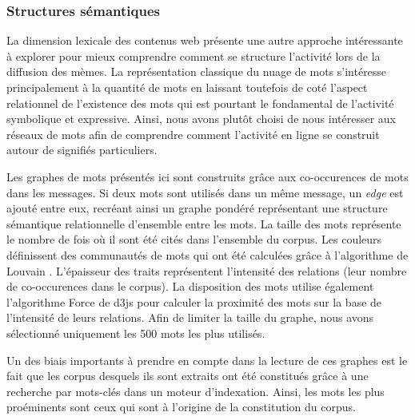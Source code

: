 \subsubsection[Structures s\'emantiques]{Structures s\'emantiques}
La dimension lexicale des contenus web pr\'esente une autre approche
int\'eressante \`a explorer pour mieux comprendre comment se structure
l{\textquoteright}activit\'e lors de la diffusion des m\`emes. La
repr\'esentation classique du nuage de mots
s{\textquoteright}int\'eresse principalement \`a la quantit\'e de mots
en laissant toutefois de cot\'e l{\textquoteright}aspect relationnel de
l{\textquoteright}existence des mots qui est pourtant le fondamental de
l{\textquoteright}activit\'e symbolique et expressive. Ainsi, nous
avons plut\^ot choisi de nous int\'eresser aux r\'eseaux de mots afin
de comprendre comment l{\textquoteright}activit\'e en ligne se
construit autour de signifi\'es particuliers.


Les graphes de mots pr\'esent\'es ici sont construits gr\^ace aux
co-occurences de mots dans les messages. Si deux mots sont utilis\'es
dans un m\^eme message, un \textit{edge} est ajout\'e entre eux,
recr\'eant ainsi un graphe pond\'er\'e repr\'esentant une structure
s\'emantique relationnelle d{\textquoteright}ensemble entre les mots.
La taille des mots repr\'esente le nombre de fois o\`u il sont \'et\'e
cit\'es dans l{\textquoteright}ensemble du corpus. Les couleurs
d\'efinissent des communaut\'es de mots qui ont \'et\'e calcul\'ees
gr\^ace \`a l{\textquoteright}algorithme de Louvain \citep{Blondel2008}. L{\textquoteright}\'epaisseur des traits repr\'esentent
l{\textquoteright}intensit\'e des relations (leur nombre de
co-occurences dans le corpus). La disposition des mots utilise
\'egalement l{\textquoteright}algorithme Force de d3js \citep{Bostock2011} pour calculer la proximit\'e des mots sur la base de
l{\textquoteright}intensit\'e de leurs relations. Afin de limiter la
taille du graphe, nous avons s\'electionn\'e uniquement les 500 mots
les plus utilis\'es. 


Un des biais importants \`a prendre en compte dans la lecture de ces
graphes est le fait que les corpus desquels ils sont extraits ont
\'et\'e constitu\'es gr\^ace \`a une recherche par mots-cl\'es dans un
moteur d{\textquoteright}indexation. Ainsi, les mots les plus
pro\'eminents sont ceux qui sont \`a l{\textquoteright}origine de la
constitution du corpus.

